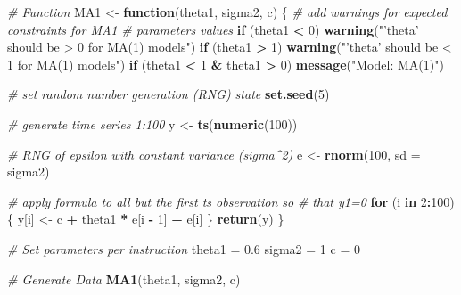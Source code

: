 \documentclass[openany]{book}
\newenvironment{Shaded}{\begin{snugshade}}{\end{snugshade}}
\newcommand{\CommentTok}[1]{\textcolor[rgb]{0.56,0.35,0.01}{\textit{#1}}}
\newcommand{\ControlFlowTok}[1]{\textcolor[rgb]{0.13,0.29,0.53}{\textbf{#1}}}
\newcommand{\DataTypeTok}[1]{\textcolor[rgb]{0.13,0.29,0.53}{#1}}
\newcommand{\DecValTok}[1]{\textcolor[rgb]{0.00,0.00,0.81}{#1}}
\newcommand{\FloatTok}[1]{\textcolor[rgb]{0.00,0.00,0.81}{#1}}
\newcommand{\KeywordTok}[1]{\textcolor[rgb]{0.13,0.29,0.53}{\textbf{#1}}}
\newcommand{\NormalTok}[1]{#1}
\newcommand{\OperatorTok}[1]{\textcolor[rgb]{0.81,0.36,0.00}{\textbf{#1}}}
\newcommand{\StringTok}[1]{\textcolor[rgb]{0.31,0.60,0.02}{#1}}
\begin{document}
\begin{Shaded}
\begin{Highlighting}[]
\CommentTok{# Function}
\NormalTok{MA1 <-}\StringTok{ }\ControlFlowTok{function}\NormalTok{(theta1, sigma2, c) \{}
  \CommentTok{# add warnings for expected constraints for MA1}
  \CommentTok{# parameters values}
  \ControlFlowTok{if}\NormalTok{ (theta1 }\OperatorTok{<}\StringTok{ }\DecValTok{0}\NormalTok{) }
    \KeywordTok{warning}\NormalTok{(}\StringTok{"'theta' should be > 0 for MA(1) models"}\NormalTok{)}
  \ControlFlowTok{if}\NormalTok{ (theta1 }\OperatorTok{>}\StringTok{ }\DecValTok{1}\NormalTok{) }
    \KeywordTok{warning}\NormalTok{(}\StringTok{"'theta' should be < 1 for MA(1) models"}\NormalTok{)}
  \ControlFlowTok{if}\NormalTok{ (theta1 }\OperatorTok{<}\StringTok{ }\DecValTok{1} \OperatorTok{&}\StringTok{ }\NormalTok{theta1 }\OperatorTok{>}\StringTok{ }\DecValTok{0}\NormalTok{) }
    \KeywordTok{message}\NormalTok{(}\StringTok{"Model: MA(1)"}\NormalTok{)}
  
  \CommentTok{# set random number generation (RNG) state}
  \KeywordTok{set.seed}\NormalTok{(}\DecValTok{5}\NormalTok{)}
  
  \CommentTok{# generate time series 1:100}
\NormalTok{  y <-}\StringTok{ }\KeywordTok{ts}\NormalTok{(}\KeywordTok{numeric}\NormalTok{(}\DecValTok{100}\NormalTok{))}
  
  \CommentTok{# RNG of epsilon with constant variance (sigma^2)}
\NormalTok{  e <-}\StringTok{ }\KeywordTok{rnorm}\NormalTok{(}\DecValTok{100}\NormalTok{, }\DataTypeTok{sd =}\NormalTok{ sigma2)}
  
  \CommentTok{# apply formula to all but the first ts observation so}
  \CommentTok{# that y1=0}
  \ControlFlowTok{for}\NormalTok{ (i }\ControlFlowTok{in} \DecValTok{2}\OperatorTok{:}\DecValTok{100}\NormalTok{) \{}
\NormalTok{    y[i] <-}\StringTok{ }\NormalTok{c }\OperatorTok{+}\StringTok{ }\NormalTok{theta1 }\OperatorTok{*}\StringTok{ }\NormalTok{e[i }\OperatorTok{-}\StringTok{ }\DecValTok{1}\NormalTok{] }\OperatorTok{+}\StringTok{ }\NormalTok{e[i]}
\NormalTok{  \}}
  \KeywordTok{return}\NormalTok{(y)}
\NormalTok{\}}

\CommentTok{# Set parameters per instruction}
\NormalTok{theta1 =}\StringTok{ }\FloatTok{0.6}
\NormalTok{sigma2 =}\StringTok{ }\DecValTok{1}
\NormalTok{c =}\StringTok{ }\DecValTok{0}

\CommentTok{# Generate Data}
\KeywordTok{MA1}\NormalTok{(theta1, sigma2, c)}
\end{Highlighting}
\end{Shaded}
\end{document}
